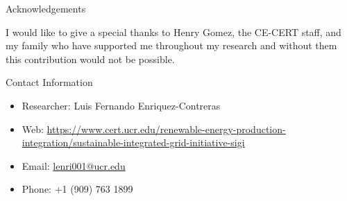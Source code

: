 \documentclass[final, 20 pt]{beamer}
\newlength{\onecolwid}
\begin{document}
\begin{frame}[t]
\begin{columns}[t]
\begin{column}{\onecolwid}

%
%



\begin{block}{Acknowledgements}

I would like to give a special thanks to Henry Gomez, the CE-CERT staff, and my family who have supported me throughout my research and without them this contribution would not be possible. \\

\end{block}



\begin{alertblock}{Contact Information}

\begin{itemize}
\item Researcher: Luis Fernando Enriquez-Contreras
\item Web: \href{https://www.cert.ucr.edu/renewable-energy-production-integration/sustainable-integrated-grid-initiative-sigi}{https://www.cert.ucr.edu/renewable-energy-production-integration/sustainable-integrated-grid-initiative-sigi}
\item Email: \href{lenri001@ucr.edu}{lenri001@ucr.edu}
\item Phone: +1 (909) 763 1899
\end{itemize}


\end{alertblock}
\end{column}
\end{columns}
\end{frame}
\end{document}
